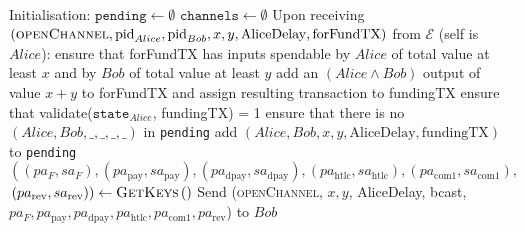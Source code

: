 \ \\ 
  \label{alg:lightningprot}
  \begin{algorithmic}[1]
    \State Initialisation:
    \Indent
      \State $\mathtt{pending} \gets \emptyset$
      \State $\mathtt{channels} \gets \emptyset$
    \EndIndent
    \State
    \State Upon receiving $\left(\textsc{openChannel}, \mathrm{pid}_{Alice},
    \mathrm{pid}_{Bob}, x, y, \mathrm{AliceDelay}, \mathrm{forFundTX}\right)$
    from $\mathcal{E}$ (self is $Alice$):
    \Indent
      \State ensure that forFundTX has inputs spendable by $Alice$ of total
      value at least $x$ and by $Bob$ of total value at least $y$
      \State add an $\left(Alice \wedge Bob\right)$ output of value $x + y$ to
      forFundTX and assign resulting transaction to fundingTX
      \State ensure that validate($\mathtt{state}_{Alice}$, fundingTX) = 1
      \State ensure that there is no $\left(Alice, Bob, \_, \_, \_, \_\right)$
      in \texttt{pending}
      \State add $\left(Alice, Bob, x, y, \mathrm{AliceDelay},
      \mathrm{fundingTX}\right)$ to \texttt{pending}
      \State $\left(\left(pa_F, sa_F\right), \left(pa_{\mathrm{pay}},
      sa_{\mathrm{pay}}\right), \left(pa_{\mathrm{dpay}},
      sa_{\mathrm{dpay}}\right), \left(pa_{\mathrm{htlc}},
      sa_{\mathrm{htlc}}\right), \left(pa_{\mathrm{com}1},
      sa_{\mathrm{com}1}\right),\right.$ $\left.\left(pa_{\mathrm{rev}},
      sa_{\mathrm{rev}}\right)\right) \gets \textsc{GetKeys}\left(\right)$
      \State Send (\textsc{openChannel}, $x, y$, AliceDelay, bcast, $pa_F,
      pa_{\mathrm{pay}}, pa_{\mathrm{dpay}}, pa_{\mathrm{htlc}},
      pa_{\mathrm{com}1}, pa_{\mathrm{rev}}$) to $Bob$
    \EndIndent
    \State


\end{algorithmic}
